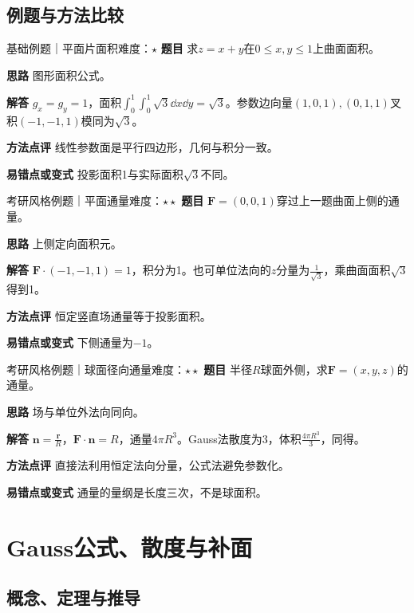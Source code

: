 \subsection{例题与方法比较}
\begin{example}{基础例题｜平面片面积}{难度：$\star$}
\label{ex:8:7}\textbf{题目} 求$z=x+y$在$0\le x,y\le1$上曲面面积。\par
\textbf{思路} 图形面积公式。\par
\textbf{解答} $g_x=g_y=1$，面积$\int_0^1\int_0^1\sqrt3\dd x\dd y=\sqrt3$。参数边向量$(1,0,1),(0,1,1)$叉积$(-1,-1,1)$模同为$\sqrt3$。\par
\textbf{方法点评} 线性参数面是平行四边形，几何与积分一致。\par
\textbf{易错点或变式} 投影面积1与实际面积$\sqrt3$不同。
\end{example}
\begin{example}{考研风格例题｜平面通量}{难度：$\star\star$}
\label{ex:8:8}\textbf{题目} $\bm F=(0,0,1)$穿过上一题曲面上侧的通量。\par
\textbf{思路} 上侧定向面积元。\par
\textbf{解答} $\bm F\cdot(-1,-1,1)=1$，积分为1。也可单位法向的$z$分量为$\frac{1}{\sqrt3}$，乘曲面面积$\sqrt3$得到1。\par
\textbf{方法点评} 恒定竖直场通量等于投影面积。\par
\textbf{易错点或变式} 下侧通量为$-1$。
\end{example}
\begin{example}{考研风格例题｜球面径向通量}{难度：$\star\star$}
\label{ex:8:9}\textbf{题目} 半径$R$球面外侧，求$\bm F=(x,y,z)$的通量。\par
\textbf{思路} 场与单位外法向同向。\par
\textbf{解答} $\bm n=\frac{\bm r}{R}$，$\bm F\cdot\bm n=R$，通量$4\pi R^3$。Gauss法散度为3，体积$\frac{4\pi R^3}{3}$，同得。\par
\textbf{方法点评} 直接法利用恒定法向分量，公式法避免参数化。\par
\textbf{易错点或变式} 通量的量纲是长度三次，不是球面积。
\end{example}
\section{Gauss公式、散度与补面}\label{sec:8:4}
\subsection{概念、定理与推导}

